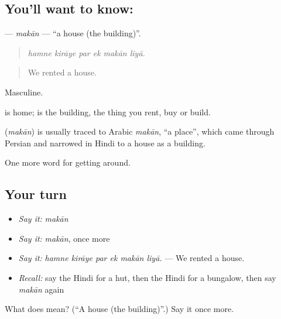 \subsection*{You'll want to know: }
\textbf{} — \emph{makān} — \textquotedblleft{}a house (the building)\textquotedblright{}.

\begin{quote}
     
\end{quote}

\begin{quote}
\emph{hamne kirāye par ek makān liyā.}
\end{quote}

\begin{quote}
We rented a house.
\end{quote}

Masculine.

 is home;  is the building, the thing you rent, buy or build.

\begin{cousinweb}
\textbf{} (\emph{makān}) is usually traced to Arabic \emph{makān}, \textquotedblleft{}a place\textquotedblright{}, which came through Persian and narrowed in Hindi to a house as a building.
\end{cousinweb}

\begin{grammarlens}[title={What you've built}]
One more word for getting around.
\end{grammarlens}

\subsection*{Your turn}
\begin{itemize}
\raggedright
  \item \emph{Say it:} \emph{makān}
  \item \emph{Say it:} \emph{makān}, once more
  \item \emph{Say it:} \emph{hamne kirāye par ek makān liyā.} — We rented a house.
  \item \emph{Recall:} say the Hindi for a hut, then the Hindi for a bungalow, then say \emph{makān} again
\end{itemize}

\begin{tcolorbox}[breakable,colback=teal!4,colframe=teal!35!black,title={Before you move on}]
What does  mean? (\textquotedblleft{}A house (the building)\textquotedblright{}.) Say it once more.
\end{tcolorbox}
